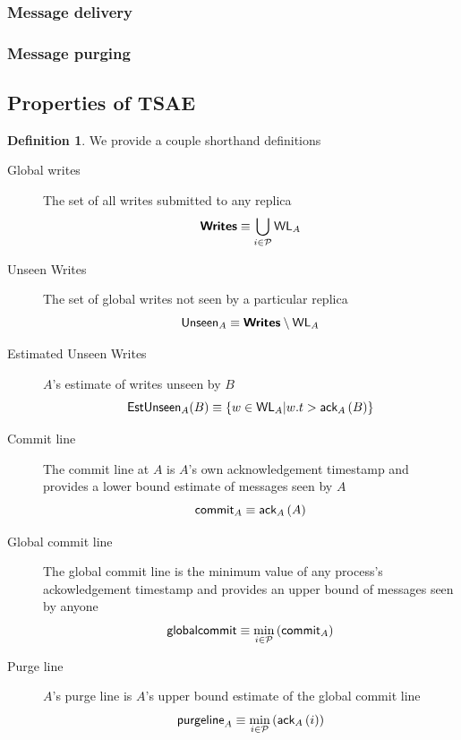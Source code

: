 \documentclass[]             %
{NASA}                       %
\theoremstyle{definition}
\newtheorem{definition}[theorem]{Definition}
\begin{document}
\clearpage

\subsubsection{Message delivery}

\subsubsection{Message purging}

\subsection{Properties of TSAE}

\begin{definition}
  We provide a couple shorthand definitions
\begin{description}
  \item[Global writes] The set of all writes submitted to any replica
    \[ \textbf{\textsf{Writes}} \equiv \bigcup_{i \in \mathcal{P}} \textsf{WL}_{A}\]
  \item[Unseen Writes] The set of global writes not seen by a particular replica
    \[\textsf{Unseen}_{A} \equiv \textbf{\textsf{Writes}} \setminus \textsf{WL}_{A} \]
  \item[Estimated Unseen Writes] $A$'s estimate of writes unseen by $B$
    \[\textsf{EstUnseen}_{A}{\left(B\right)} \equiv \{w \in \textsf{WL}_{A} | w.t > \textsf{ack}_{A}\left(B\right) \} \]
  \item[Commit line] The commit line at $A$ is $A$'s own
    acknowledgement timestamp and provides a lower bound estimate of
    messages seen by $A$
    \[\textsf{commit}_{A} \equiv \textsf{ack}_{A}\left(A\right)\]
  \item[Global commit line] The global commit line is the minimum
    value of any process's ackowledgement timestamp and provides an
    upper bound of messages seen by anyone
    \[ \textsf{globalcommit} \equiv \min_{i \in \mathcal{P}} \left( \textsf{commit}_{A} \right) \]
  \item[Purge line] $A$'s purge line is $A$'s upper bound estimate of the global commit line
    \[ \textsf{purgeline}_{A} \equiv \min_{i \in \mathcal{P}} \left( \textsf{ack}_{A}\left(i\right) \right) \]
  \end{description}
\end{definition}


\end{document}
